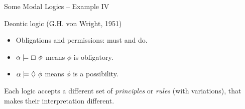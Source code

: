 \documentclass[aspectratio=169]{beamer}
\begin{document}
\begin{slide}{Some Modal Logics -- Example IV}\label{s:20}
\small
\begin{block}{Deontic logic (G.H. von Wright, 1951)}
\begin{itemize}
\item Obligations and permissions: \alert{must} and  do.
\item $\alpha \models \boxempty~\phi$ means $\phi$ is obligatory.
\item $\alpha \models \Diamond~\phi$ means $\phi$ is a possibility.
\end{itemize}
\end{block}

Each logic accepts a different set of \emph{principles} or \emph{rules} (with variations), that makes their interpretation different.

\end{slide}
\end{document}

